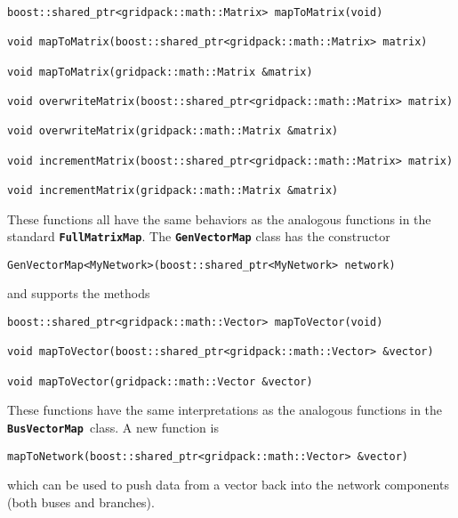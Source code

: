 {
\color{red}
\begin{Verbatim}[fontseries=b]
boost::shared_ptr<gridpack::math::Matrix> mapToMatrix(void)

void mapToMatrix(boost::shared_ptr<gridpack::math::Matrix> matrix)

void mapToMatrix(gridpack::math::Matrix &matrix)

void overwriteMatrix(boost::shared_ptr<gridpack::math::Matrix> matrix)

void overwriteMatrix(gridpack::math::Matrix &matrix)

void incrementMatrix(boost::shared_ptr<gridpack::math::Matrix> matrix)

void incrementMatrix(gridpack::math::Matrix &matrix)
\end{Verbatim}
}

These functions all have the same behaviors as the analogous functions in the standard \texttt{\textbf{FullMatrixMap}}. The \texttt{\textbf{GenVectorMap}} class has the constructor

{
\color{red}
\begin{Verbatim}[fontseries=b]
GenVectorMap<MyNetwork>(boost::shared_ptr<MyNetwork> network)
\end{Verbatim}
}

and supports the methods

{
\color{red}
\begin{Verbatim}[fontseries=b]
boost::shared_ptr<gridpack::math::Vector> mapToVector(void)

void mapToVector(boost::shared_ptr<gridpack::math::Vector> &vector)

void mapToVector(gridpack::math::Vector &vector)
\end{Verbatim}
}

These functions have the same interpretations as the analogous functions in the \texttt{\textbf{BusVectorMap }}class. A new function is

{
\color{red}
\begin{Verbatim}[fontseries=b]
mapToNetwork(boost::shared_ptr<gridpack::math::Vector> &vector)
\end{Verbatim}
}

which can be used to push data from a vector back into the network components (both buses and branches).
